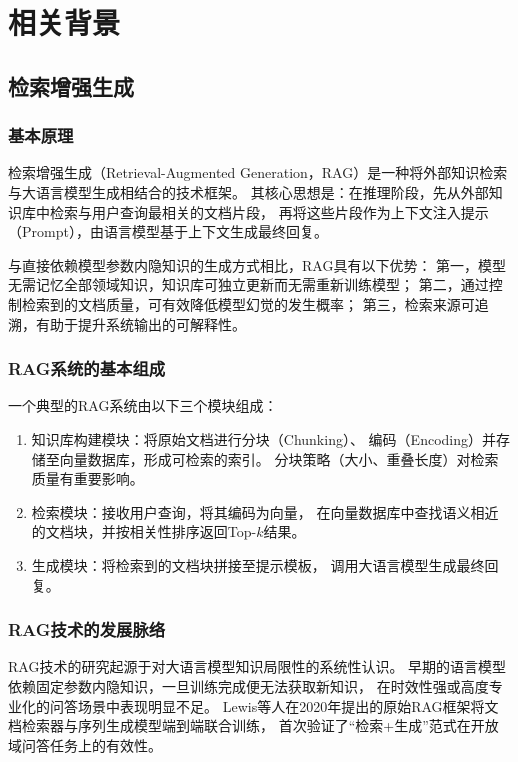 \chapter{相关背景}

\section{检索增强生成}

\subsection{基本原理}

检索增强生成（Retrieval-Augmented Generation，RAG）是一种将外部知识检索
与大语言模型生成相结合的技术框架。
其核心思想是：在推理阶段，先从外部知识库中检索与用户查询最相关的文档片段，
再将这些片段作为上下文注入提示（Prompt），由语言模型基于上下文生成最终回复。

与直接依赖模型参数内隐知识的生成方式相比，RAG具有以下优势：
第一，模型无需记忆全部领域知识，知识库可独立更新而无需重新训练模型；
第二，通过控制检索到的文档质量，可有效降低模型幻觉的发生概率；
第三，检索来源可追溯，有助于提升系统输出的可解释性。

\subsection{RAG系统的基本组成}

一个典型的RAG系统由以下三个模块组成：

\begin{enumerate}
    \item 知识库构建模块：将原始文档进行分块（Chunking）、
    编码（Encoding）并存储至向量数据库，形成可检索的索引。
    分块策略（大小、重叠长度）对检索质量有重要影响。

    \item 检索模块：接收用户查询，将其编码为向量，
    在向量数据库中查找语义相近的文档块，并按相关性排序返回Top-$k$结果。

    \item 生成模块：将检索到的文档块拼接至提示模板，
    调用大语言模型生成最终回复。
\end{enumerate}

\subsection{RAG技术的发展脉络}

RAG技术的研究起源于对大语言模型知识局限性的系统性认识。
早期的语言模型依赖固定参数内隐知识，一旦训练完成便无法获取新知识，
在时效性强或高度专业化的问答场景中表现明显不足。
Lewis等人在2020年提出的原始RAG框架将文档检索器与序列生成模型端到端联合训练，
首次验证了“检索+生成”范式在开放域问答任务上的有效性。

